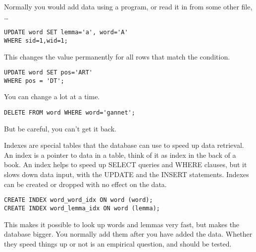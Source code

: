 \documentclass[a4paper,landscape,headrule,footrule,dvips]{foils}
\begin{document}
\begin{CJK}{UTF8}{min}
Normally you would add data using a program, or read it in from some
other file, \ldots


\begin{verbatim}
UPDATE word SET lemma='a', word='A'
WHERE sid=1,wid=1;
\end{verbatim}

This changes the value permanently for all rows that match the
condition.

\begin{verbatim}
UPDATE word SET pos='ART'
WHERE pos = 'DT';
\end{verbatim}

You can change a lot at a time.


\begin{verbatim}
DELETE FROM word WHERE word='gannet';
\end{verbatim}

But be careful, you can't get it back.


Indexes are special tables that the database can use to speed up data
retrieval.  An index is a pointer to data in a table, think of it as
index in the back of a book.  An index helps to speed up SELECT
queries and WHERE clauses, but it slows down data input, with the
UPDATE and the INSERT statements. Indexes can be created or dropped
with no effect on the data.

\begin{verbatim}
CREATE INDEX word_word_idx ON word (word);
CREATE INDEX word_lemma_idx ON word (lemma);
\end{verbatim}

This makes it possible to look up words and lemmas very fast, but makes the
database bigger.  You normally add them after you have added the
data.  Whether they speed things up or not is an empirical question,
and should be tested.








\clearpage
\end{CJK}
\end{document}
